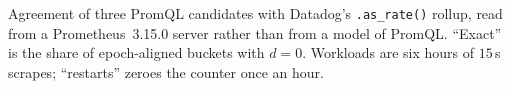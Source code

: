 \begin{table}[htbp]\centering\footnotesize

\caption{Agreement of three PromQL candidates with Datadog's \texttt{.as\_rate()} rollup,
read from a Prometheus~3.15.0 server rather than from a model of PromQL. ``Exact'' is the
share of epoch-aligned buckets with $d=0$. Workloads are six hours of $15$\,s scrapes;
``restarts'' zeroes the counter once an hour.}
\label{tab:rollup-live}
\end{table}

\iffull\fi

\iffull\fi

\iffull\fi

\iffull\fi
